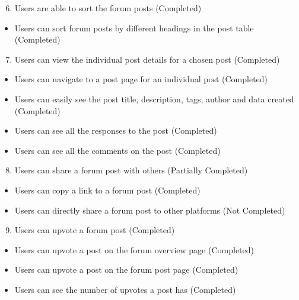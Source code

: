 \begin{enumerate}
    \setcounter{enumi}{5}
    \item Users are able to sort the forum posts (Completed)
\end{enumerate}
\begin{itemize}
    \setlength{\itemindent}{1.5em}
    \item Users can sort forum posts by different headings in the post table (Completed)
\end{itemize}

\begin{enumerate}
    \setcounter{enumi}{6}
    \item Users can view the individual post details for a chosen post (Completed)
\end{enumerate}
\begin{itemize}
    \setlength{\itemindent}{1.5em}
    \item Users can navigate to a post page for an individual post (Completed)
    \item Users can easily see the post title, description, tags, author and data created (Completed)
    \item Users can see all the responses to the post (Completed)
    \item Users can see all the comments on the post (Completed)
\end{itemize}

\begin{enumerate}
    \setcounter{enumi}{7}
    \item Users can share a forum post with others (Partially Completed)
\end{enumerate}
\begin{itemize}
    \setlength{\itemindent}{1.5em}
    \item Users can copy a link to a forum post (Completed)
    \item Users can directly share a forum post to other platforms (Not Completed)
\end{itemize}

\begin{enumerate}
    \setcounter{enumi}{8}
    \item Users can upvote a forum post (Completed)
\end{enumerate}
\begin{itemize}
    \setlength{\itemindent}{1.5em}
    \item Users can upvote a post on the forum overview page (Completed)
    \item Users can upvote a post on the forum post page (Completed)
    \item Users can see the number of upvotes a post has (Completed)
\end{itemize}


